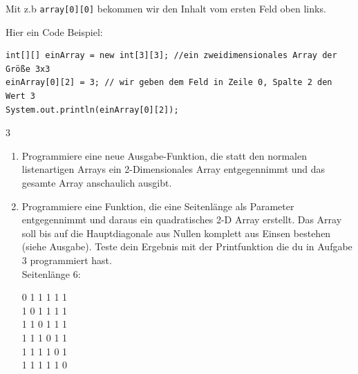 \documentclass{../../sheet}
\begin{document}
Mit z.b \texttt{array[0][0]} bekommen wir den Inhalt vom ersten Feld oben links.

Hier ein Code Beispiel:
\begin{verbatim}
int[][] einArray = new int[3][3]; //ein zweidimensionales Array der Größe 3x3
einArray[0][2] = 3; // wir geben dem Feld in Zeile 0, Spalte 2 den Wert 3
System.out.println(einArray[0][2]);
    \end{verbatim}
          \begin{ausgabe}
              3
          \end{ausgabe}

\begin{enumerate}
     \item Programmiere eine neue Ausgabe-Funktion, die statt den normalen listenartigen Arrays ein 2-Dimensionales Array entgegennimmt und das gesamte Array anschaulich ausgibt.
     \item Programmiere eine Funktion, die eine Seitenlänge als Parameter entgegennimmt und daraus ein quadratisches 2-D Array erstellt. Das Array soll bis auf die Hauptdiagonale aus Nullen komplett aus Einsen bestehen (siehe Ausgabe). Teste dein Ergebnis mit der Printfunktion die du in Aufgabe 3 programmiert hast.\\
          Seitenlänge 6:
          \begin{ausgabe}
              0 1 1 1 1 1\\
              1 0 1 1 1 1\\
              1 1 0 1 1 1\\
              1 1 1 0 1 1\\
              1 1 1 1 0 1\\
              1 1 1 1 1 0
          \end{ausgabe}   


\end{enumerate}
\end{document}
